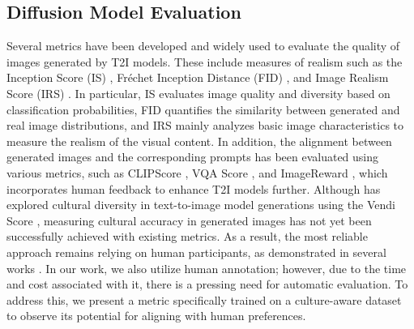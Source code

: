 \subsection{Diffusion Model Evaluation}
Several metrics have been developed and widely used to evaluate the quality of images generated by T2I models. These include measures of realism such as the Inception Score (IS) \citep{salimans2016improved}, Fréchet Inception Distance (FID) \citep{heusel2017gans}, and Image Realism Score (IRS) \citep{chen2023quantifying}. In particular, IS evaluates image quality and diversity based on classification probabilities, FID quantifies the similarity between generated and real image distributions, and IRS mainly analyzes basic image characteristics to measure the realism of the visual content.
In addition, the alignment between generated images and the corresponding prompts has been evaluated using various metrics, such as CLIPScore \citep{hessel2021clipscore}, VQA Score \citep{lin2025evaluating}, and ImageReward \citep{xu2023imagereward}, which incorporates human feedback to enhance T2I models further. Although \citet{kannenbeyond} has explored cultural diversity in text-to-image model generations using the Vendi Score \citep{nguyen2024quality}, measuring cultural accuracy in generated images has not yet been successfully achieved with existing metrics. As a result, the most reliable approach remains relying on human participants, as demonstrated in several works \citep{kannenbeyond, nayak2024benchmarking}. In our work, we also utilize human annotation; however, due to the time and cost associated with it, there is a pressing need for automatic evaluation. To address this, we present a metric specifically trained on a culture-aware dataset to observe its potential for aligning with human preferences.